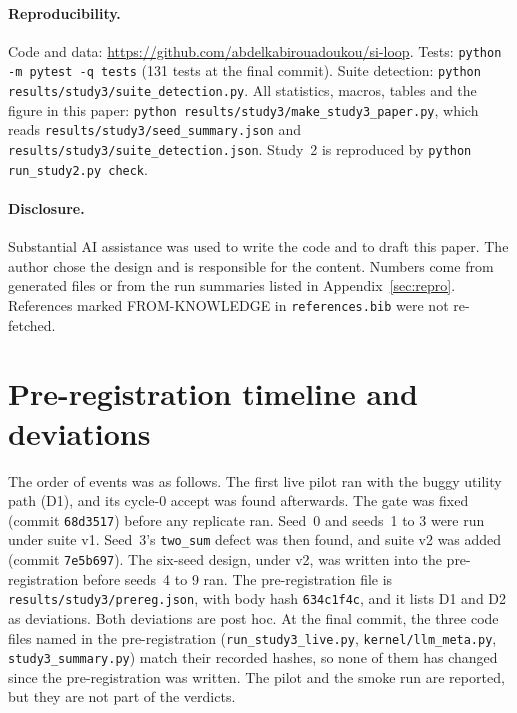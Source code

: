 \documentclass[11pt]{article}
\newcommand{\repo}{\url{https://github.com/abdelkabirouadoukou/si-loop}}
\begin{document}
\paragraph{Reproducibility.} Code and data: \repo. Tests: \texttt{python -m pytest -q tests} (131 tests at the final commit). Suite detection: \texttt{python results/study3/suite\_detection.py}. All statistics, macros, tables and the figure in this paper: \texttt{python results/study3/make\_study3\_paper.py}, which reads \texttt{results/study3/seed\_summary.json} and \texttt{results/study3/suite\_detection.json}. Study~2 is reproduced by \texttt{python run\_study2.py check}.

\paragraph{Disclosure.} Substantial AI assistance was used to write the code and to draft this paper. The author chose the design and is responsible for the content. Numbers come from generated files or from the run summaries listed in Appendix~\ref{sec:repro}. References marked FROM-KNOWLEDGE in \texttt{references.bib} were not re-fetched.




\appendix
\section{Pre-registration timeline and deviations}
\label{app:timeline}

The order of events was as follows. The first live pilot ran with the buggy utility path (D1), and its cycle-0 accept was found afterwards. The gate was fixed (commit \texttt{68d3517}) before any replicate ran. Seed~0 and seeds~1 to 3 were run under suite v1. Seed~3's \texttt{two\_sum} defect was then found, and suite v2 was added (commit \texttt{7e5b697}). The six-seed design, under v2, was written into the pre-registration before seeds~4 to 9 ran. The pre-registration file is \texttt{results/study3/prereg.json}, with body hash \texttt{634c1f4c}, and it lists D1 and D2 as deviations.
Both deviations are post hoc. At the final commit, the three code files named in the pre-registration (\texttt{run\_study3\_live.py}, \texttt{kernel/llm\_meta.py}, \texttt{study3\_summary.py}) match their recorded hashes, so none of them has changed since the pre-registration was written. The pilot and the smoke run are reported, but they are not part of the verdicts.
\end{document}
